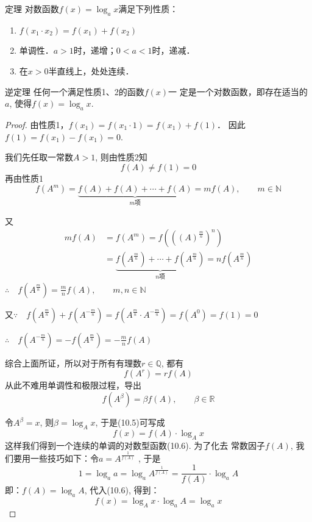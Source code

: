 \begin{blk}{定理}
  对数函数$f(x)=\log_a x$满足下列性质：
  \begin{enumerate}
    \item $f(x_1\cdot x_2)=f(x_1)+f(x_2)$
    \item 单调性．$a>1$时，递增；$0<a<1$时，递减．
    \item 在$x>0$半直线上，处处连续．
  \end{enumerate}
\end{blk}
 
\begin{blk}{逆定理} 
  任何一个满足性质1、2的函数$f(x)$一
定是一个对数函数，即存在适当的$a$, 使得$f(x)=\log_a x$.
\end{blk}

\begin{proof}
  由性质1，$f(x_1)=f(x_1\cdot 1)=f(x_1)+f(1)$．
因此$f(1)=f(x_1)-f(x_1)=0$.

我们先任取一常数$A>1$, 则由性质2知
\[f(A)\ne f(1)=0\]
再由性质1
\[f(A^m)=\underbrace{f(A)+f(A)+\cdots+f(A)}_{\text{$m$项}}=mf(A),\qquad m\in\mathbb{N}\]

又
\[\begin{split}
  mf(A)&=f(A^m)=f\left(\left((A)^{\tfrac{m}{n}}\right)^n\right)\\
  &=\underbrace{f\left(A^{\tfrac{m}{n}}\right)+\cdots+f\left(A^{\tfrac{m}{n}}\right)}_{\text{$n$项}}=nf\left(A^{\tfrac{m}{n}}\right)
\end{split} \]
$\therefore\quad f\left(A^{\tfrac{m}{n}}\right)=\frac{m}{n}f(A),\qquad m,n\in\mathbb{N}$

又$\because\quad f\left(A^{\tfrac{m}{n}}\right)+f\left(A^{-\tfrac{m}{n}}\right)=f\left(A^{\tfrac{m}{n}}\cdot A^{-\tfrac{m}{n}}\right)=f(A^0)=f(1)=0$

$\therefore\quad f\left(A^{-\tfrac{m}{n}}\right)=-f\left(A^{\tfrac{m}{n}}\right)=-\frac{m}{n}f(A)$

综合上面所证，所以对于所有有理数$r\in\mathbb{Q}$, 都有
\[f(A^r)=rf(A)\]
从此不难用单调性和极限过程，导出
\begin{equation}
  f(A^{\beta })=\beta f(A),\qquad \beta \in\mathbb{R}
\end{equation}

令$A^{\beta }=x$, 则$\beta =\log_A x$, 于是(10.5)可写成
\begin{equation}
  f(x)=f(A)\cdot \log_A x
\end{equation}
这样我们得到一个连续的单调的对数型函数(10.6). 为了化去
常数因子$f(A)$, 我们要用一些技巧如下：令$a=A^{\tfrac{1}{f(A)}}$
, 于是
\[1=\log_a a=\log_a A^{\tfrac{1}{f(A)}}=\frac{1}{f(A)}\cdot \log_a A\]
即：$f(A)=\log_a A$, 代入(10.6), 得到：
\[f(x)=\log_A x\cdot \log_a A=\log_a x\]
\end{proof}

